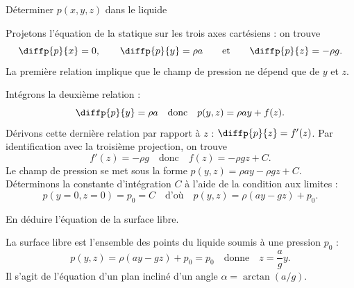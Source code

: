\medskip

\debutEntrainement



\begin{enonce}
Déterminer $p(x,y,z)$ dans le liquide
\end{enonce}


\begin{corrige}
Projetons l'équation de la statique sur les trois axes cartésiens : on trouve
\[
\diffp{p}{x}	=	0, \qquad
\diffp{p}{y}	=	\rho a\qquad\text{et}\qquad
\diffp{p}{z}	=	-\rho g.
\]
La première relation implique que le champ de pression ne dépend que de $y$ et $z$. 

Intégrons la deuxième relation : 
\[
\diffp{p}{y}=\rho a
\quad\text{donc}\quad
p(y,z)=\rho ay+f(z).
\]
Dérivons cette dernière relation par rapport à $z$ : $\diffp{p}{z}=f'(z)$. Par identification avec la troisième projection, on trouve
\[
f'(z)=-\rho g
\quad\text{donc}\quad
f(z)=-\rho gz+C.
\]
Le champ de pression se met sous la forme $p(y,z)=\rho ay-\rho gz+C$. Déterminons la constante d'intégration $C$ à l'aide de la condition aux limites :
\[
p(y=0,z=0)=p_0=C
\quad\text{d'où}\quad
p(y,z)=\rho(ay-gz)+p_0.
\]
\end{corrige}



\begin{enonce}
En déduire l'équation de la surface libre.
\end{enonce}


\begin{corrige}
La surface libre est l'ensemble des points du liquide soumis à une pression $p_0$ : 
\[
p(y,z)=\rho(ay-gz)+p_0=p_0
\quad\text{donne}\quad
z=\frac{a}{g}y.	
\]
Il s'agit de l'équation d'un plan incliné d'un angle $\alpha=\arctan{(a/g)}$.
\end{corrige}


